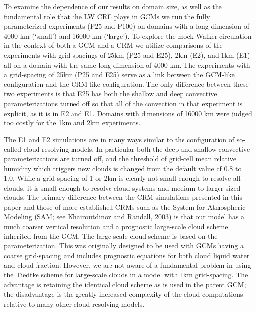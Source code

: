 \documentclass[draft]{agujournal2019}
\begin{document}
To examine the dependence of our results on domain size, as well as the fundamental role that the LW CRE plays in GCMs
we run the fully parameterized experiments (P25 and P100) on domains with a long dimension of 4000 km (`small') and 16000 km (`large').  
To explore the mock-Walker circulation in the context of both a GCM and a CRM we utilize 
comparisons of the experiments with grid-spacings of 25km (P25 and E25), 2km (E2), and 1km (E1) all on a domain with the same long dimension 
of 4000 km.  The experiments with a grid-spacing of 25km (P25 and E25) serve as a link between the GCM-like configuration and the CRM-like 
configuration.  The only difference between these two experiments is that E25 has both the shallow and deep convective parameterizations turned 
off so that all of the convection in that experiment is explicit, as it is in E2 and E1.  Domains with dimensions of 16000 km were judged too 
costly for the 1km and 2km experiments.  

The E1 and E2 simulations are in many ways similar to the configuration of so-called cloud resolving models.  
In particular both the deep and shallow convective parameterizations are turned off, and the threshold of grid-cell mean relative humidity 
which triggers new clouds is changed from the default value of 0.8 to 1.0.  While a grid spacing of 1 or 2km is clearly not small enough
to resolve all clouds, it is small enough to resolve cloud-systems and medium to larger sized clouds.  The primary 
difference between the CRM simulations presented in this paper and those of more established CRMs such as  the 
System for Atmospheric Modeling (SAM; see Khairoutdinov and Randall, 2003) is that our model
has a much coarser vertical resolution and a prognostic large-scale cloud scheme inherited from the GCM.  The large-scale cloud
scheme is based on the  parameterization.  This was originally designed to be used with GCMs having a coarse grid-spacing
and includes prognostic equations for both cloud liquid water and cloud fraction.  
However, we are not aware of a fundamental problem in using the Tiedtke scheme for large-scale clouds in a model with 1km grid-spacing.   
The advantage is retaining the identical cloud scheme as is used in the parent GCM; the disadvantage is the greatly increased complexity of the 
cloud computations relative to many other cloud resolving models.    
\end{document}
